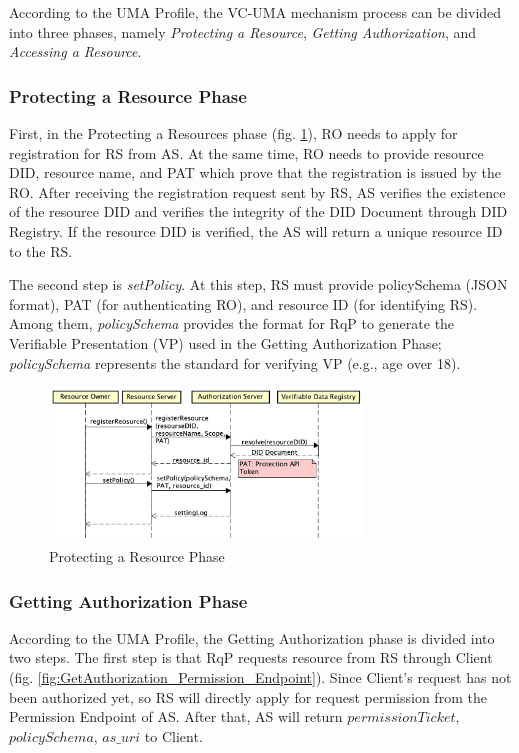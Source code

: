\documentclass[conference, dvipdfmx]{IEEEtran} %
\begin{document}
\begin{sloppypar}
According to the UMA Profile\cite{UMA}, the VC-UMA mechanism process can be divided into three phases, namely \textit{Protecting a Resource}, \textit{Getting Authorization}, and \textit{Accessing a Resource}.

\subsubsection{Protecting a Resource Phase}

First, in the Protecting a Resources phase (fig. \ref{fig:ProtectResource}), RO needs to apply for registration for RS from AS.
At the same time, RO needs to provide resource DID, resource name, and PAT which prove that the registration is issued by the RO. 
After receiving the registration request sent by RS, AS verifies the existence of the resource DID and verifies the integrity of the DID Document through DID Registry. If the resource DID is verified, the AS will return a unique resource ID to the RS.

The second step is \textit{setPolicy}. At this step, RS must provide policySchema (JSON format), PAT (for authenticating RO), and resource ID (for identifying RS).
Among them, \textit{policySchema} provides the format for RqP to generate the Verifiable Presentation (VP) used in the Getting Authorization Phase; \textit{policySchema} represents the standard for verifying VP (e.g., age over 18).

\begin{figure}[htbp] %
  \begin{center} %
  \includegraphics[width=83mm]{images/ProtectResource.png} %
  \caption{Protecting a Resource Phase} %
  \label{fig:ProtectResource} %
  \end{center}
\end{figure}


\subsubsection{Getting Authorization Phase}
According to the UMA Profile, the Getting Authorization phase is divided into two steps. The first step is that RqP requests resource from RS through Client (fig. \ref{fig:GetAuthorization_Permission_Endpoint}). Since Client's request has not been authorized yet, so RS will directly apply for request permission from the Permission Endpoint of AS. After that, AS will return $permission Ticket$, $policySchema$, $as\_uri$ to Client.


\end{sloppypar}
\end{document}
